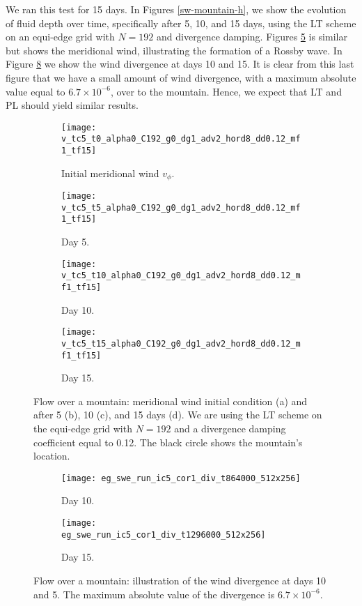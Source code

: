 We ran this test for 15 days.
In Figures \ref{sw-mountain-h}, we show the evolution of fluid depth over time,
specifically after 5, 10, and 15 days, using the LT scheme on an equi-edge grid with $N=192$ and divergence damping.
Figures \ref{sw-mountain-u} is similar but shows the meridional wind, illustrating the formation of a Rossby wave.
In Figure \ref{sw-mountain-div} we show the wind divergence at days 10 and 15.
It is clear from this last figure that we have a small amount of wind divergence, with a maximum absolute value equal to $6.7 \times 10^{-6}$, over to the mountain.
Hence, we expect that LT and PL should yield similar results.
\newpage

\begin{figure}[!h]
	\centering
	\begin{subfigure}{0.48\textwidth}
		\centering
		\texttt{[image: v\_tc5\_t0\_alpha0\_C192\_g0\_dg1\_adv2\_hord8\_dd0.12\_mf1\_tf15]}
		\caption{Initial meridional wind $v_{\phi}$.\label{sw-mountain-v-d0}}
	\end{subfigure}
	\begin{subfigure}{0.48\textwidth}
		\centering
		\texttt{[image: v\_tc5\_t5\_alpha0\_C192\_g0\_dg1\_adv2\_hord8\_dd0.12\_mf1\_tf15]}
		\caption{Day 5.\label{sw-mountain-v-d5}}
	\end{subfigure}
	
	\begin{subfigure}{0.49\textwidth}
		\centering
		\texttt{[image: v\_tc5\_t10\_alpha0\_C192\_g0\_dg1\_adv2\_hord8\_dd0.12\_mf1\_tf15]}
		\caption{Day 10.\label{sw-mountain-v-d10}}
	\end{subfigure}
	\begin{subfigure}{0.49\textwidth}
		\centering
		\texttt{[image: v\_tc5\_t15\_alpha0\_C192\_g0\_dg1\_adv2\_hord8\_dd0.12\_mf1\_tf15]}
		\caption{Day 15.\label{sw-mountain-v-d15}}
	\end{subfigure}
	\caption{Flow over a mountain: meridional wind initial condition (a) and after 5 (b), 10 (c), and 15 days (d). 
		We are using the LT scheme on the equi-edge grid with $N=192$ and a divergence damping coefficient equal to 0.12. The black circle shows the mountain's location.
		\label{sw-mountain-u}}
\end{figure}
\begin{figure}[!h]
	\centering
	\begin{subfigure}{0.49\textwidth}
		\centering
		\texttt{[image: eg\_swe\_run\_ic5\_cor1\_div\_t864000\_512x256]}
		\caption{Day 10.\label{sw-mountain-div-d10}}
	\end{subfigure}
	\begin{subfigure}{0.49\textwidth}
		\centering
		\texttt{[image: eg\_swe\_run\_ic5\_cor1\_div\_t1296000\_512x256]}
		\caption{Day 15.\label{sw-mountain-div-d15}}
	\end{subfigure}
	\caption{Flow over a mountain: illustration of the wind divergence at days 10 and 5.
		The maximum absolute value of the divergence is $6.7\times 10^{-6}$.
		\label{sw-mountain-div}}
\end{figure}

